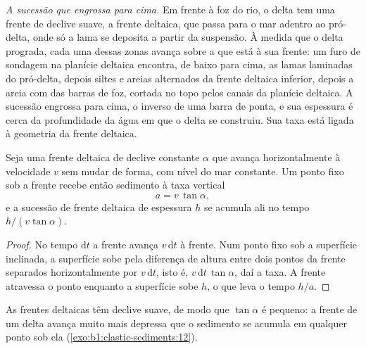 \emph{A sucessão que engrossa para cima.} Em frente à foz do rio, o delta tem uma frente de declive suave, a frente deltaica, que passa para o mar adentro ao pró-delta, onde só a lama se deposita a partir da suspensão. À medida que o delta prograda, cada uma dessas zonas avança sobre a que está à sua frente: um furo de sondagem na planície deltaica encontra, de baixo para cima, as lamas laminadas do pró-delta, depois siltes e areias alternados da frente deltaica inferior, depois a areia com  das barras de foz, cortada no topo pelos canais da planície deltaica. A sucessão engrossa para cima, o inverso de uma barra de ponta, e sua espessura é cerca da profundidade da água em que o delta se construiu. Sua taxa está ligada à geometria da frente deltaica.

\begin{proposition}\label{prop:b1:clastic-sediments:progradation}
Seja uma frente deltaica de declive constante $\alpha$ que avança horizontalmente à velocidade $v$ sem mudar de forma, com nível do mar constante. Um ponto fixo sob a frente recebe então sedimento à taxa vertical
\[
  a = v\,\tan\alpha,
\]
e a sucessão de frente deltaica de espessura $h$ se acumula ali no tempo $h/(v\tan\alpha)$.
\end{proposition}

\begin{proof}
No tempo $\mathrm dt$ a frente avança $v\,\mathrm dt$ à frente. Num ponto fixo sob a superfície inclinada, a superfície sobe pela diferença de altura entre dois pontos da frente separados horizontalmente por $v\,\mathrm dt$, isto é, $v\,\mathrm dt\,\tan\alpha$, daí a taxa. A frente atravessa o ponto enquanto a superfície sobe $h$, o que leva o tempo $h/a$.
\end{proof}

As frentes deltaicas têm declive suave, de modo que $\tan\alpha$ é pequeno: a frente de um delta avança muito mais depressa que o sedimento se acumula em qualquer ponto sob ela (\cref{exo:b1:clastic-sediments:12}).

